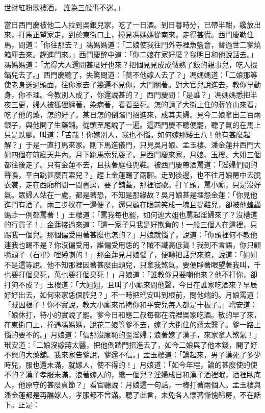 \begin{showcontents}{}
世財紅粉歌樓酒，  誰為三般事不迷。」

當日西門慶被他二人拉到吳銀兒家，吃了一日酒。到日暮時分，已帶半酣，纔放出來，打馬正望家走，到於東街口上，撞見馮媽媽從南來，走得甚慌。西門慶勒住馬，問道：「你往那去？」馮媽媽道：「二娘使我往門外寺裡魚籃會，替過世二爹燒箱庫去來。趕進門來。」西門慶醉中道：「你二娘在家好麼？我明日和他說話去。」馮媽媽道：「尤得大人還問甚麼好也來？把個見見成成做熟了飯的親事兒，吃人掇鍋兒去了。」西門慶聽了，失驚問道：「莫不他嫁人去了？」馮媽媽道：「二娘那等使老身送過頭面，往你家去了幾遍不見你，大門關著。對大官兒說進去，教你早動身，你不理。今教別人成了，你還說甚的？」西門慶問：「是誰？」馮媽媽悉把半夜三更，婦人被狐狸纏著，染病著，看看至死。怎的請了大街上住的蔣竹山來看，吃了他的藥，怎的好了。某日怎的倒踏門招進來，成其夫婦。見今二娘拿出三百兩銀子，與他開了生藥舖。從頭至尾說了一遍。這西門慶不聽便罷，聽了氣的在馬上只是跌腳。叫道：「苦哉！你嫁別人，我也不惱。如何嫁那矮王八！他有甚麼起解？」于是一直打馬來家。剛下馬進儀門，只見吳月娘、孟玉樓、潘金蓮并西門大姐四個在前廳天井內，月下跳馬索兒耍子。見西門慶來家，月娘、玉樓、大姐三個都往後走了。只有金蓮不去，且扶著庭柱兜鞋。被西門慶帶酒罵道：「淫婦們間的聲喚，平白跳甚麼百索兒？」趕上金蓮踢了兩腳。走到後邊，也不往月娘房中去脫衣裳，走在西廂稍間一間書房，要了舖蓋，那裡宿歇。打丫頭，罵小廝，只是沒好氣。眾婦人站在一處，都是著恐，不知是那緣故？吳月娘甚是埋怨金蓮：「你見他進門有酒了。兩三步扠在一邊便了，還只顧在眼前笑成一塊且提鞋兒，卻被他蝗蟲螞蚱一例都罵著！」王樓道：「罵我每也罷，如何連大姐也罵起淫婦來了？沒槽道的行貨子！」金蓮接過來道：「這一家子只我是好欺負的！一般三個人在這裡，只踢我一個兒。那個偏受用著甚麼也怎的？」月娘就惱了，說道：「你頭裡何不教他連我也踢不是？你沒偏受用，誰偏受用恁的？賊不識高低貨！我到不言語，你只顧嘴頭子〈石畢〉哩礡喇的！」那金蓮見月娘惱了，便轉把話兒來摭，說道：「姐姐不是這等說。他不知那裡因著甚麼由頭兒，只拿我煞氣。要便睜著眼望著我叫，千也要打個臭死，萬也要打個臭死！」月娘道：「誰教你只要嘲他來？他不打你，卻打狗不成？」玉樓道：「大姐姐，且叫了小廝來問他聲，今日在誰家吃酒來？早辰好好出去，如何來家恁個腔兒？」不一時把玳安叫到根前，問他端的。月娘罵道：「賊囚根子！你不實說，教大小廝來吊拷你和平安兒每人都是十板子。」玳安道：「娘休打，待小的實說了罷。爹今日和應二叔每都在院裡吳家吃酒。散的早了來，在東街口上，撞遇馮媽媽，說花二娘等爹不去，嫁了大街住的蔣太醫了。爹一路上惱的要不的。」月娘道：「信那沒廉恥的歪淫婦；浪著嫁了漢子，來家拿人煞氣！」玳安道：「二娘沒嫁蔣太醫，把他倒踏門招進去了，如今二娘與了他本錢，開了好不興的大藥舖。我來家告爹說，爹還不信。」孟玉樓道：「論起來，男子漢死了多少時兒，服也還未滿，就嫁人，使不得的！」月娘道：「如今年程，論的甚麼使的使不的？漢子孝服未滿，浪著嫁人的，纔一個兒？淫婦成日和漢子酒裡眠，酒裡臥底人，他原守的甚麼貞節？」看官聽說：月娘這一句話，一棒打著兩個人。孟玉樓與潘金蓮都是再醮嫁人，孝服都不曾滿。聽了此言，未免各人懷著慚愧歸房，不在話下。正是：


\end{showcontents}
